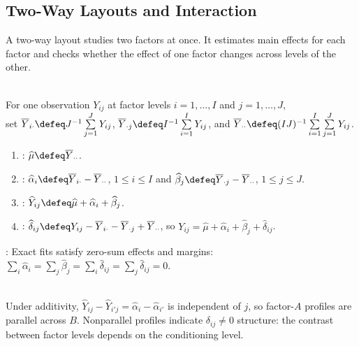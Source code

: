 \subsection{Two-Way Layouts and Interaction}

A two-way layout studies two factors at once.  It estimates main effects for each factor and checks whether the effect of one factor changes across levels of the other.

\begin{definition} \label{def:two-way-additive-parametrization} \\
For one observation $Y_{ij}$ at factor levels $i=1,\ldots,I$ and $j=1,\ldots,J$,\\
set $\overline{Y}_{i\cdot}\defeq J^{-1}\sum\limits_{j=1}^{J}Y_{ij}$, $\overline{Y}_{\cdot j}\defeq I^{-1}\sum\limits_{i=1}^{I}Y_{ij}$, and $\overline{Y}_{\cdot\cdot}\defeq (IJ)^{-1}\sum\limits_{i=1}^{I}\sum\limits_{j=1}^{J}Y_{ij}$.
\begin{enumerate}[label=(\roman*)]
\setlength{\itemsep}{0pt}
\item {}: $\widehat{\mu}\defeq\overline{Y}_{\cdot\cdot}$.
\item {}: $\widehat{\alpha}_i\defeq\overline{Y}_{i\cdot}-\overline{Y}_{\cdot\cdot}$, $1\leq i\leq I$ and $\widehat{\beta}_j\defeq\overline{Y}_{\cdot j}-\overline{Y}_{\cdot\cdot}$, $1\leq j\leq J$.
\item {}: $\widehat{Y}_{ij}\defeq\widehat{\mu}+\widehat{\alpha}_i+\widehat{\beta}_j$.
\item {}: $\widehat{\delta}_{ij}\defeq Y_{ij}-\overline{Y}_{i\cdot}-\overline{Y}_{\cdot j}+\overline{Y}_{\cdot\cdot}$, so $Y_{ij}=\widehat{\mu}+\widehat{\alpha}_i+\widehat{\beta}_j+\widehat{\delta}_{ij}$.
\end{enumerate}
: Exact fits satisfy zero-sum effects and margins: $\sum\limits_i\widehat{\alpha}_i=\sum\limits_j\widehat{\beta}_j=\sum\limits_i\widehat{\delta}_{ij}=\sum\limits_j\widehat{\delta}_{ij}=0$.
\end{definition}

\begin{remark} \label{rem:two-way-interaction-profile-plots} \\
Under additivity, $\widehat{Y}_{ij}-\widehat{Y}_{i'j}=\widehat{\alpha}_i-\widehat{\alpha}_{i'}$ is independent of $j$, so factor-$A$ profiles are parallel across $B$. Nonparallel profiles indicate $\delta_{ij}\neq0$ structure: the contrast between factor levels depends on the conditioning level.
\end{remark}

